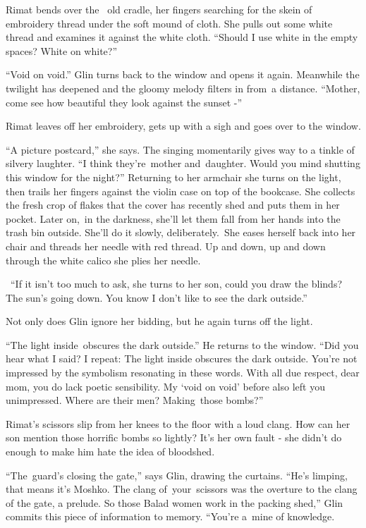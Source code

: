 \documentclass[12pt]{book}
\begin{document}
{Rimat bends over the \ old cradle, her fingers searching for the
}skein {of embroidery thread under the soft mound of cloth. She pulls
}out some {white thread and examines it against the white cloth.
``Should I use white in the }empty{ spaces? White on white?''}

{{}``Void on void.'' Glin
}turns{ back to the window and opens it again. Meanwhile the twilight
has deepened and the gloomy melody filters in from~a distance. ``Mother, come see how beautiful they look against the
sunset -''}

{Rimat leaves off her embroidery, gets up with a sigh and goes over to
the window. }

{{}``A picture postcard,'' she says. The singing momentarily gives way
to a tinkle of silvery laughter. ``I think they're~mother and~daughter}. Would you mind shutting this window for the
night?{{}'' }Returning{
}{to her armchair she turns on the light, }then trails her fingers
{against the violin case on }top
of{ }{the bookcase. She
collects the fresh crop of flakes that the cover has recently shed and
}puts{ them in her pocket. Later on},~in the darkness,
{she'll let them fall from her hands into the trash bin
}outside{. She'll do it slowly, deliberately.~She eases herself back
into her chair and threads her needle with red thread. Up and down, up and down }through the white calico she
{plies her needle. \ }

{\ {}``If it isn't}{
}{too much to ask,{\textquotedbl} she }turns to her son,
{{\textquotedbl}could you }draw the blinds? The sun's going
down.{ You know I don't like to see the dark}
{outside.''}

{Not only does Glin
}ignore{ her bidding, but he again turns off the light. }

{{}``The light inside~o}bscures
{the dark outside.'' He returns to the window. ``Did you hear what I
said? I repeat}{:}{ The light
inside }obscures{ the dark outside. You're not impressed by the
symbolism resonating in these words. With all due respect, }dear mom,
{you do lack poetic sensibility. My `void on void' }before also left
you unimpressed.{ Where are their men?
}Making{~those bombs?''}

Rimat's scissors slip from her knees to the floor with a loud clang. How can her son mention those horrific bombs so
lightly? It's her own fault - she didn't do enough to make him hate the idea of bloodshed.

{}``The~guard's closing the gate,'' says Glin, drawing the curtains. ``He's limping, that means it's Moshko. The clang
of~your~scissors was the overture to the clang of the gate, a prelude. So those Balad women work in the packing shed,''
Glin commits this piece of information to memory. ``You're a~mine of knowledge.{\textquotedbl}
\end{document}

